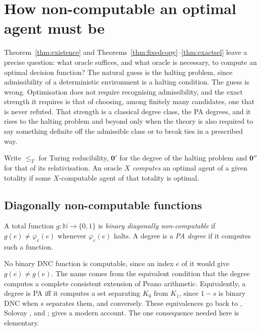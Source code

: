 \section{How non-computable an optimal agent must be}\label{sec:degrees}

Theorem~\ref{thm:existence} and Theorems~\ref{thm:fixedcopy}--\ref{thm:exactsel} leave a precise
question: what oracle suffices, and what oracle is necessary, to compute an optimal decision
function? The natural guess is the halting problem, since admissibility of a deterministic
environment is a halting condition. The guess is wrong. Optimisation does not require recognising
admissibility, and the exact strength it requires is that of choosing, among
finitely many candidates, one that is never refuted. That strength is a classical degree class, the
PA degrees, and it rises to the halting problem and beyond only when the theory is also required to
say something definite off the admissible class or to break ties in a prescribed way.

Write $\le_T$ for Turing reducibility, $\mathbf 0'$ for the degree of the halting problem and
$\mathbf 0''$ for that of its relativisation. An oracle $X$ \emph{computes} an optimal agent of a
given totality if some $X$-computable agent of that totality is optimal.

\subsection{Diagonally non-computable functions}

\begin{definition}\label{def:dnc}
A total function $g:\mathbb N\to\{0,1\}$ is \emph{binary diagonally non-computable} if
$g(e)\neq\varphi_e(e)$ whenever $\varphi_e(e)$ halts. A degree is a \emph{PA degree} if it computes
such a function.
\end{definition}

No binary DNC function is computable, since an index $e$ of it would give $g(e)\neq g(e)$. The name
comes from the equivalent condition that the degree computes a complete consistent extension of
Peano arithmetic. Equivalently, a degree is PA iff it computes a set separating $K_0$ from $K_1$, since
$1-s$ is binary DNC when $s$ separates them, and conversely. These equivalences go back to
\textcite{scott1962}, Solovay \autocite[Thm.~V.5.36]{odifreddi1989}, and
\textcite{jockuschsoare1972trans}; \textcite[§3.1]{hirschfeldt2014} gives a
modern account. The one consequence needed here is elementary.

